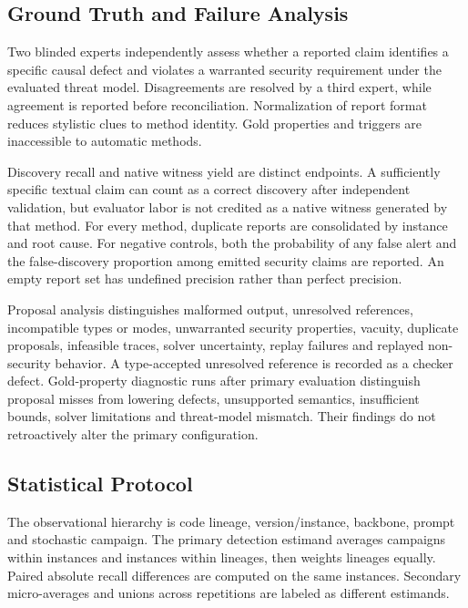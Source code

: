 \documentclass[journal]{IEEEtran}
\theoremstyle{definition}
\begin{document}
\subsection{Ground Truth and Failure Analysis}

Two blinded experts independently assess whether a reported claim identifies a specific causal defect and violates a warranted security requirement under the evaluated threat model. Disagreements are resolved by a third expert, while agreement is reported before reconciliation. Normalization of report format reduces stylistic clues to method identity. Gold properties and triggers are inaccessible to automatic methods.

Discovery recall and native witness yield are distinct endpoints. A sufficiently specific textual claim can count as a correct discovery after independent validation, but evaluator labor is not credited as a native witness generated by that method. For every method, duplicate reports are consolidated by instance and root cause. For negative controls, both the probability of any false alert and the false-discovery proportion among emitted security claims are reported. An empty report set has undefined precision rather than perfect precision.

Proposal analysis distinguishes malformed output, unresolved references, incompatible types or modes, unwarranted security properties, vacuity, duplicate proposals, infeasible traces, solver uncertainty, replay failures and replayed non-security behavior. A type-accepted unresolved reference is recorded as a checker defect. Gold-property diagnostic runs after primary evaluation distinguish proposal misses from lowering defects, unsupported semantics, insufficient bounds, solver limitations and threat-model mismatch. Their findings do not retroactively alter the primary configuration.

\subsection{Statistical Protocol}

The observational hierarchy is code lineage, version/instance, backbone, prompt and stochastic campaign. The primary detection estimand averages campaigns within instances and instances within lineages, then weights lineages equally. Paired absolute recall differences are computed on the same instances. Secondary micro-averages and unions across repetitions are labeled as different estimands.
\end{document}
